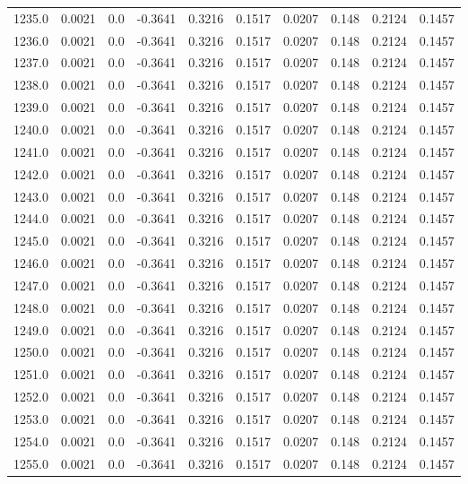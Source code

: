 \begin{longtable}{lrrrrrrrrr}
1235.0 & 0.0021 & 0.0 & -0.3641 & 0.3216 & 0.1517 & 0.0207 & 0.148 & 0.2124 & 0.1457 \\
1236.0 & 0.0021 & 0.0 & -0.3641 & 0.3216 & 0.1517 & 0.0207 & 0.148 & 0.2124 & 0.1457 \\
1237.0 & 0.0021 & 0.0 & -0.3641 & 0.3216 & 0.1517 & 0.0207 & 0.148 & 0.2124 & 0.1457 \\
1238.0 & 0.0021 & 0.0 & -0.3641 & 0.3216 & 0.1517 & 0.0207 & 0.148 & 0.2124 & 0.1457 \\
1239.0 & 0.0021 & 0.0 & -0.3641 & 0.3216 & 0.1517 & 0.0207 & 0.148 & 0.2124 & 0.1457 \\
1240.0 & 0.0021 & 0.0 & -0.3641 & 0.3216 & 0.1517 & 0.0207 & 0.148 & 0.2124 & 0.1457 \\
1241.0 & 0.0021 & 0.0 & -0.3641 & 0.3216 & 0.1517 & 0.0207 & 0.148 & 0.2124 & 0.1457 \\
1242.0 & 0.0021 & 0.0 & -0.3641 & 0.3216 & 0.1517 & 0.0207 & 0.148 & 0.2124 & 0.1457 \\
1243.0 & 0.0021 & 0.0 & -0.3641 & 0.3216 & 0.1517 & 0.0207 & 0.148 & 0.2124 & 0.1457 \\
1244.0 & 0.0021 & 0.0 & -0.3641 & 0.3216 & 0.1517 & 0.0207 & 0.148 & 0.2124 & 0.1457 \\
1245.0 & 0.0021 & 0.0 & -0.3641 & 0.3216 & 0.1517 & 0.0207 & 0.148 & 0.2124 & 0.1457 \\
1246.0 & 0.0021 & 0.0 & -0.3641 & 0.3216 & 0.1517 & 0.0207 & 0.148 & 0.2124 & 0.1457 \\
1247.0 & 0.0021 & 0.0 & -0.3641 & 0.3216 & 0.1517 & 0.0207 & 0.148 & 0.2124 & 0.1457 \\
1248.0 & 0.0021 & 0.0 & -0.3641 & 0.3216 & 0.1517 & 0.0207 & 0.148 & 0.2124 & 0.1457 \\
1249.0 & 0.0021 & 0.0 & -0.3641 & 0.3216 & 0.1517 & 0.0207 & 0.148 & 0.2124 & 0.1457 \\
1250.0 & 0.0021 & 0.0 & -0.3641 & 0.3216 & 0.1517 & 0.0207 & 0.148 & 0.2124 & 0.1457 \\
1251.0 & 0.0021 & 0.0 & -0.3641 & 0.3216 & 0.1517 & 0.0207 & 0.148 & 0.2124 & 0.1457 \\
1252.0 & 0.0021 & 0.0 & -0.3641 & 0.3216 & 0.1517 & 0.0207 & 0.148 & 0.2124 & 0.1457 \\
1253.0 & 0.0021 & 0.0 & -0.3641 & 0.3216 & 0.1517 & 0.0207 & 0.148 & 0.2124 & 0.1457 \\
1254.0 & 0.0021 & 0.0 & -0.3641 & 0.3216 & 0.1517 & 0.0207 & 0.148 & 0.2124 & 0.1457 \\
1255.0 & 0.0021 & 0.0 & -0.3641 & 0.3216 & 0.1517 & 0.0207 & 0.148 & 0.2124 & 0.1457 \\

\end{longtable}
